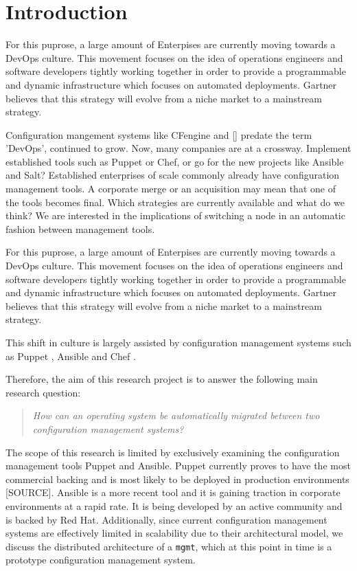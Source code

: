\section{Introduction}\label{sec:introduction}
For this puprose, a large amount of Enterpises are currently moving towards a DevOps culture. This movement focuses on the idea of operations engineers and software developers tightly working together in order to provide a programmable and dynamic infrastructure which focuses on automated deployments. Gartner believes that this strategy will evolve from a niche market to a mainstream strategy. 

Configuration mangement systems like CFengine and [] predate the term 'DevOps', continued to grow. Now, many companies are at a crossway. Implement established tools such as Puppet or Chef, or go for the new projects like Ansible and Salt? Established enterprises of scale commonly already have configuration management tools. A corporate merge or an acquisition may mean that one of the tools becomes final. Which strategies are currently available and what do we think? We are interested in the implications of switching a node in an automatic fashion between management tools. 


For this puprose, a large amount of Enterpises are currently moving towards a DevOps culture. This movement focuses on the idea of operations engineers and software developers tightly working together in order to provide a programmable and dynamic infrastructure which focuses on automated deployments. Gartner believes that this strategy will evolve from a niche market to a mainstream strategy. 

This shift in culture is largely assisted by configuration management systems such as Puppet \cite{whatispuppet}, Ansible \cite{whatisansible} and Chef \cite{whatischef}. 

Therefore, the aim of this research project is to answer the following main research question:

\begin{quote}
\textit{How can an operating system be automatically migrated between two configuration management systems?}
\end{quote}

\noindent
The scope of this research is limited by exclusively examining the configuration management tools Puppet and Ansible. Puppet currently proves to have the most commercial backing and is most likely to be deployed in production environments [SOURCE]. Ansible is a more recent tool and it is gaining traction in corporate environments at a rapid rate. It is being developed by an active community and is backed by Red Hat. Additionally, since current configuration management systems are effectively limited in scalability due to their architectural model, we discuss the distributed architecture of a \texttt{mgmt}, which at this point in time is a prototype configuration management system.
